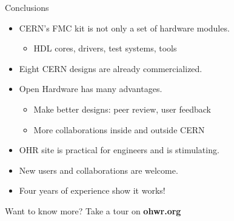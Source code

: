 \documentclass[compress,red]{beamer}
\begin{document}
\begin{frame}{Conclusions}

  \begin{block}{}
    \begin{itemize}
    \item CERN's FMC kit is not only a set of hardware modules.
      \begin{itemize}
      \item HDL cores, drivers, test systems, tools
      \end{itemize}
    \item Eight CERN designs are already commercialized.
    \item Open Hardware has many advantages.
      \begin{itemize}
      \item Make better designs: peer review, user feedback
      \item More collaborations inside and outside CERN
      \end{itemize}
    \item OHR site is practical for engineers and is stimulating.
    \item New users and collaborations are welcome.
    \item Four years of experience show it works!
    \end{itemize}
  \end{block}

  \begin{block}{}
    \begin{center}
    Want to know more? Take a tour on \textbf{ohwr.org}
    \end{center}
  \end{block}

  \note[item]{}
  \note[item]{}
  \note[item]{}

\end{frame}
\end{document}

